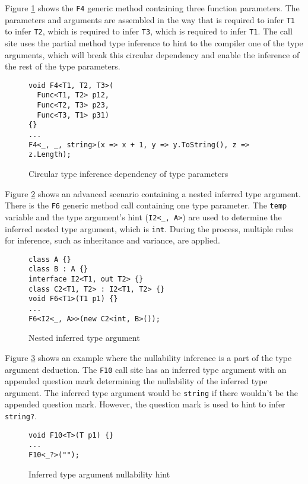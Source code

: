 Figure \ref{img73:example1} shows the \texttt{F4} generic method containing three function parameters. 
The parameters and arguments are assembled in the way that is required to infer \texttt{T1} to infer \texttt{T2}, which is required to infer \texttt{T3}, which is required to infer \texttt{T1}. 
The call site uses the partial method type inference to hint to the compiler one of the type arguments, which will break this circular dependency and enable the inference of the rest of the type parameters.
\begin{figure}[h]
\begin{lstlisting}[style=csharp, showstringspaces=false]
void F4<T1, T2, T3>(
  Func<T1, T2> p12, 
  Func<T2, T3> p23, 
  Func<T3, T1> p31) 
{}
...
F4<_, _, string>(x => x + 1, y => y.ToString(), z => z.Length); 
\end{lstlisting}
\caption{Circular type inference dependency of type parameters}
\label{img73:example1}
\end{figure}
\par
Figure \ref{img74:example2} shows an advanced scenario containing a nested inferred type argument.
There is the \texttt{F6} generic method call containing one type parameter.
The \texttt{temp} variable and the type argument’s hint (\texttt{I2<\_, A>}) are used to determine the inferred nested type argument, which is \texttt{int}.
During the process, multiple rules for inference, such as inheritance and variance, are applied.
\begin{figure}[h]
\begin{lstlisting}[style=csharp, showstringspaces=false]
class A {}
class B : A {}
interface I2<T1, out T2> {}
class C2<T1, T2> : I2<T1, T2> {}
void F6<T1>(T1 p1) {}
...
F6<I2<_, A>>(new C2<int, B>());
\end{lstlisting}
\caption{Nested inferred type argument}
\label{img74:example2}
\end{figure}
\par
Figure \ref{img75:example3} shows an example where the nullability inference is a part of the type argument deduction.
The \texttt{F10} call site has an inferred type argument with an appended question mark determining the nullability of the inferred type argument. 
The inferred type argument would be \texttt{string} if there wouldn't be the appended question mark. 
However, the question mark is used to hint to infer \texttt{string?}.
\begin{figure}[h]
\begin{lstlisting}[style=csharp, showstringspaces=false]
void F10<T>(T p1) {}
...
F10<_?>("");
\end{lstlisting}
\caption{Inferred type argument nullability hint}
\label{img75:example3}
\end{figure}
